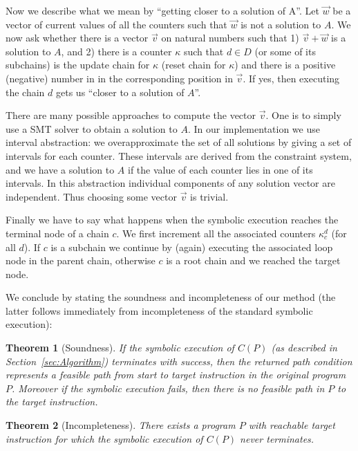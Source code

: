 \documentclass{llncs}
\newtheorem{thm}{Theorem}
\begin{document}
Now we describe what we mean by ``getting closer to a solution of A''. Let
$\vec{w}$ be a vector of current values of all the counters such that
$\vec{w}$ is not a solution to $A$. We now ask whether there is a vector
$\vec{v}$ on natural numbers such that 1) $\vec{v}+\vec{w}$ is a solution to
$A$, and 2) there is a counter $\kappa$ such that $d\in D$ (or some of its
subchains) is the update chain for $\kappa$ (reset chain for $\kappa$) and
there is a positive (negative) number in in the corresponding position in
$\vec{v}$. If yes, then executing the chain $d$ gets us ``closer to a
solution of $A$''.

There are many possible approaches to compute the vector $\vec{v}$. One is
to simply use a SMT solver to obtain a solution to $A$. In our
implementation we use interval abstraction: we overapproximate the set of
all solutions by giving a
set of intervals for each counter. These intervals are derived from
the constraint system, and we have a solution to $A$ if the value of each counter
lies in one of its intervals. In this abstraction individual components of
any solution vector are independent. Thus choosing some vector $\vec{v}$ is
trivial.

Finally we have to say what happens when the symbolic execution reaches the
terminal node of a chain $c$. We first increment all the associated
counters $\kappa_c^d$ (for all $d$). If $c$ is a subchain we continue by
(again) executing the associated loop node in the parent chain, otherwise $c$ is a root
chain and we reached the target node.

We conclude by stating the soundness and incompleteness of our method (the
latter follows immediately from incompleteness of the standard symbolic execution):

\begin{thm}[Soundness]
  If the symbolic execution of $C(P)$ (as described in
  Section~\ref{sec:Algorithm}) terminates with success,
  then the returned path  condition represents a feasible path from start to target
  instruction in the original program $P$. Moreover if the symbolic
  execution fails, then there is no feasible path in $P$ to the target instruction.
\end{thm}

\begin{thm}[Incompleteness]
  There exists a program $P$ with
reachable target instruction for which the symbolic execution of $C(P)$ never terminates.
\end{thm}
\end{document}
